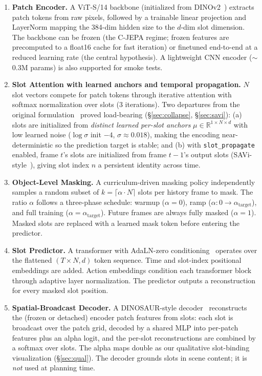 \documentclass[12pt]{article}
\begin{document}
\begin{enumerate}[label=\textbf{M\arabic*:}, leftmargin=*]
    \item \textbf{Patch Encoder.} A ViT-S/14 backbone (initialized from DINOv2~\citep{oquab2023dinov2}) extracts patch tokens from raw pixels, followed by a trainable linear projection and LayerNorm mapping the 384-dim hidden size to the $d$-dim slot dimension. The backbone can be frozen (the C-JEPA regime; frozen features are precomputed to a float16 cache for fast iteration) or finetuned end-to-end at a reduced learning rate (the central hypothesis). A lightweight CNN encoder ($\sim$0.3M params) is also supported for smoke tests.

    \item \textbf{Slot Attention with learned anchors and temporal propagation.} $N$ slot vectors compete for patch tokens through iterative attention with softmax normalization over slots (3 iterations). Two departures from the original formulation~\citep{locatello2020slot} proved load-bearing (\S\ref{sec:collapse}, \S\ref{sec:savi}): (a) slots are initialized from \emph{distinct learned per-slot anchors} $\mu \in \mathbb{R}^{1 \times N \times d}$ with low learned noise ($\log\sigma$ init $-4$, $\sigma \approx 0.018$), making the encoding near-deterministic so the prediction target is stable; and (b) with \texttt{slot\_propagate} enabled, frame $t$'s slots are initialized from frame $t{-}1$'s output slots (SAVi-style~\citep{kipf2021savi}), giving slot index $n$ a persistent identity across time.

    \item \textbf{Object-Level Masking.} A curriculum-driven masking policy independently samples a random subset of $k = \lceil \alpha \cdot N \rceil$ slots per history frame to mask. The ratio $\alpha$ follows a three-phase schedule: warmup ($\alpha = 0$), ramp ($\alpha: 0 \rightarrow \alpha_{\text{target}}$), and full training ($\alpha = \alpha_{\text{target}}$). Future frames are always fully masked ($\alpha = 1$). Masked slots are replaced with a learned mask token before entering the predictor.

    \item \textbf{Slot Predictor.} A transformer with AdaLN-zero conditioning~\citep{peebles2023dit} operates over the flattened $(T \times N, d)$ token sequence. Time and slot-index positional embeddings are added. Action embeddings condition each transformer block through adaptive layer normalization. The predictor outputs a reconstruction for every masked slot position.

    \item \textbf{Spatial-Broadcast Decoder.} A DINOSAUR-style decoder~\citep{seitzer2023dinosaur} reconstructs the (frozen or detached) encoder patch features from slots: each slot is broadcast over the patch grid, decoded by a shared MLP into per-patch features plus an alpha logit, and the per-slot reconstructions are combined by a softmax over slots. The alpha maps double as our qualitative slot-binding visualization (\S\ref{sec:qual}). The decoder grounds slots in scene content; it is \emph{not} used at planning time.
\end{enumerate}
\end{document}
